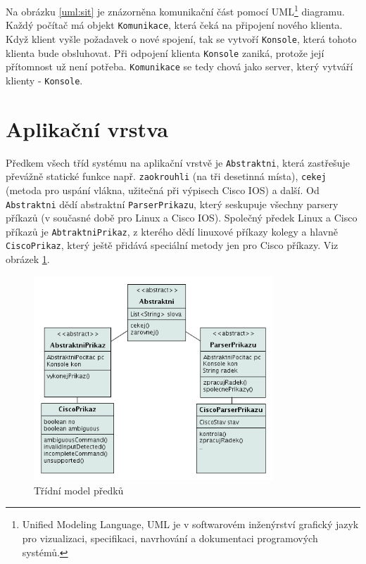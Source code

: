 Na obrázku \ref{uml:sit} je znázorněna komunikační část pomocí UML\footnote{Unified Modeling Language, UML je v softwarovém inženýrství grafický jazyk pro vizualizaci, specifikaci, navrhování a dokumentaci programových systémů.\cite{wiki:uml}} diagramu. Každý počítač má objekt \verb|Komunikace|, která čeká na připojení nového klienta. Když klient vyšle požadavek o nové spojení, tak se vytvoří \verb|Konsole|, která tohoto klienta bude obsluhovat. Při odpojení klienta \verb|Konsole| zaniká, protože její přítomnost už není potřeba. \verb|Komunikace| se tedy chová jako server, který vytváří klienty - \verb|Konsole|.


\section{Aplikační vrstva}
Předkem všech tříd systému na aplikační vrstvě je \verb|Abstraktni|, která zastřešuje převážně statické funkce např. \verb|zaokrouhli| (na tři desetinná místa), \verb|cekej| (metoda pro uspání vlákna, užitečná při výpisech Cisco IOS) a další. Od \verb|Abstraktni| dědí abstraktní \verb|ParserPrikazu|, který seskupuje všechny parsery příkazů (v současné době pro Linux a Cisco IOS). Společný předek Linux a Cisco příkazů je \verb|AbtraktniPrikaz|, z kterého dědí linuxové příkazy kolegy a hlavně \verb|CiscoPrikaz|, který ještě přidává speciální metody jen pro Cisco příkazy. Viz obrázek \ref{uml:abstraktni}.

\begin{figure}[h]
\begin{center}
\includegraphics[width=9cm]{figures/uml_abtraktni.png}
\caption{Třídní model předků}
\label{uml:abstraktni}
\end{center}
\end{figure}

